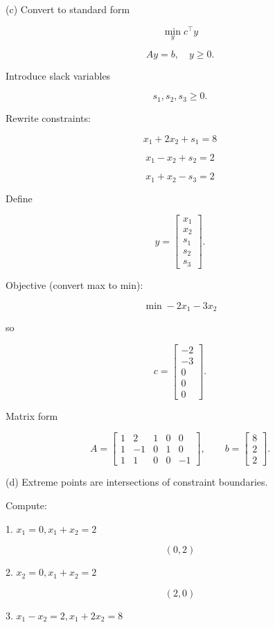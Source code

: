 \documentclass[
	12pt,
]{fphw}
\begin{document}
\bigskip

(c) Convert to standard form

\[
\min_{y} c^\top y
\]

\[
Ay = b, \quad y \ge 0.
\]

Introduce slack variables

\[
s_1,s_2,s_3 \ge 0.
\]

Rewrite constraints:

\[
x_1 + 2x_2 + s_1 = 8
\]

\[
x_1 - x_2 + s_2 = 2
\]

\[
x_1 + x_2 - s_3 = 2
\]

Define

\[
y =
\begin{bmatrix}
x_1\\
x_2\\
s_1\\
s_2\\
s_3
\end{bmatrix}.
\]

Objective (convert max to min):

\[
\min -2x_1 -3x_2
\]

so

\[
c =
\begin{bmatrix}
-2\\
-3\\
0\\
0\\
0
\end{bmatrix}.
\]

Matrix form

\[
A =
\begin{bmatrix}
1 & 2 & 1 & 0 & 0 \\
1 & -1 & 0 & 1 & 0 \\
1 & 1 & 0 & 0 & -1
\end{bmatrix},
\qquad
b =
\begin{bmatrix}
8\\
2\\
2
\end{bmatrix}.
\]

\bigskip

(d) Extreme points are intersections of constraint boundaries.

Compute:

1. \(x_1=0, x_1+x_2=2\)

\[
(0,2)
\]

2. \(x_2=0, x_1+x_2=2\)

\[
(2,0)
\]

3. \(x_1-x_2=2, x_1+2x_2=8\)
\end{document}
